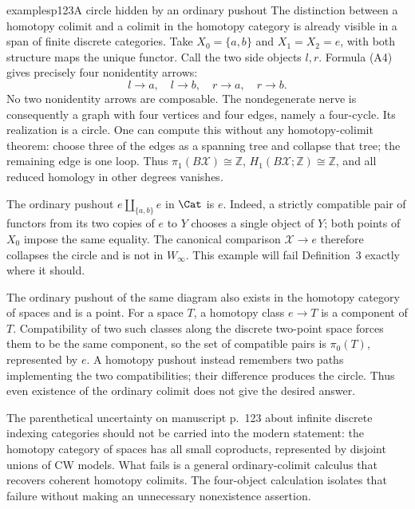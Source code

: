 \begin{dcomment}{examples}{p123}{A circle hidden by an ordinary pushout}
The distinction between a homotopy colimit and a colimit in the homotopy category is already visible in a span of finite discrete categories.  Take $X_0=\{a,b\}$ and $X_1=X_2=e$, with both structure maps the unique functor.  Call the two side objects $l,r$.  Formula (A4) gives precisely four nonidentity arrows:
\[
 l\to a,\quad l\to b,\quad r\to a,\quad r\to b.
\]
No two nonidentity arrows are composable.  The nondegenerate nerve is consequently a graph with four vertices and four edges, namely a four-cycle.  Its realization is a circle.  One can compute this without any homotopy-colimit theorem: choose three of the edges as a spanning tree and collapse that tree; the remaining edge is one loop.  Thus $\pi_1(B\mathcal X)\cong\mathbb Z$, $H_1(B\mathcal X;\mathbb Z)\cong\mathbb Z$, and all reduced homology in other degrees vanishes.

The ordinary pushout $e\amalg_{\{a,b\}}e$ in $\Cat$ is $e$.  Indeed, a strictly compatible pair of functors from its two copies of $e$ to $Y$ chooses a single object of $Y$; both points of $X_0$ impose the same equality.  The canonical comparison $\mathcal X\to e$ therefore collapses the circle and is not in $W_\infty$.  This example will fail Definition~3 exactly where it should.

The ordinary pushout of the same diagram also exists in the homotopy category of spaces and is a point.  For a space $T$, a homotopy class $e\to T$ is a component of $T$.  Compatibility of two such classes along the discrete two-point space forces them to be the same component, so the set of compatible pairs is $\pi_0(T)$, represented by $e$.  A homotopy pushout instead remembers two paths implementing the two compatibilities; their difference produces the circle.  Thus even existence of the ordinary colimit does not give the desired answer.

The parenthetical uncertainty on manuscript p.~123 about infinite discrete indexing categories should not be carried into the modern statement: the homotopy category of spaces has all small coproducts, represented by disjoint unions of CW models.  What fails is a general ordinary-colimit calculus that recovers coherent homotopy colimits.  The four-object calculation isolates that failure without making an unnecessary nonexistence assertion.
\end{dcomment}

